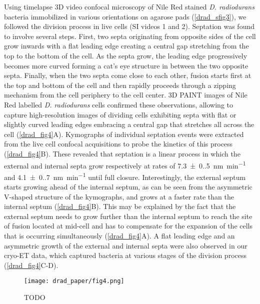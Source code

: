 Using timelapse 3D video confocal microscopy of Nile Red stained \textit{D. radiodurans} bacteria immobilized in various orientations on agarose pads (\autoref{drad_sfig3}), we followed the division process in live cells (SI videos 1 and 2).
Septation was found to involve several steps.
First, two septa originating from opposite sides of the cell grow inwards with a flat leading edge creating a central gap stretching from the top to the bottom of the cell.
As the septa grow, the leading edge progressively becomes more curved forming a cat's eye structure in between the two opposite septa.
Finally, when the two septa come close to each other, fusion starts first at the top and bottom of the cell and then rapidly proceeds through a zipping mechanism from the cell periphery to the cell center.
3D PAINT images of Nile Red labelled \textit{D. radiodurans} cells confirmed these observations, allowing to capture high-resolution images of dividing cells exhibiting septa with flat or slightly curved leading edges embracing a central gap that stretches all across the cell (\autoref{drad_fig4}A).
Kymographs of individual septation events were extracted from the live cell confocal acquisitions to probe the kinetics of this process (\autoref{drad_fig4}B).
These revealed that septation is a linear process in which the external and internal septa grow respectively at rates of \qty{7.3(0.5)}{nm.min^{-1}}  and \qty{4.1(0.7)}{nm.min^{-1}} until full closure.
Interestingly, the external septum starts growing ahead of the internal septum, as can be seen from the asymmetric V-shaped structure of the kymographs, and grows at a faster rate than the internal septum (\autoref{drad_fig4}B).
This may be explained by the fact that the external septum needs to grow further than the internal septum to reach the site of fusion located at mid-cell and has to compensate for the expansion of the cells that is occurring simultaneously (\autoref{drad_fig4}A).
A flat leading edge and an asymmetric growth of the external and internal septa were also observed in our cryo-ET data, which captured bacteria at various stages of the division process (\autoref{drad_fig4}C-D).

\begin{figure}[ht]
    \centering
    \texttt{[image: drad\_paper/fig4.png]}
    \caption{TODO}
    \label{drad_fig4}
\end{figure}

